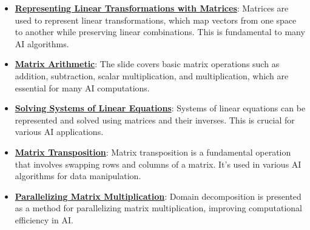 \documentclass{article}%
\begin{document}
\begin{itemize}[leftmargin=*]%
\item \href{https://purdue.brightspace.com/d2l/common/assets/pdfjs-d2l-dist/1.0.14-legacy/web/viewer.html?file=\%2Fcontent\%2Fenforced\%2F1095467-wl.202510.CS.24300.001\%2F04L1-Linear Algebra Primer.pdf\%3Fou\%3D1095467\&lang=en-us\&container=d2l-fileviewer-rendered-pdf\&fullscreen=d2l-fileviewer-rendered-pdf-dialog\&height=667#page=5}{\textbf{Representing Linear Transformations with Matrices}}: Matrices are used to represent linear transformations, which map vectors from one space to another while preserving linear combinations. This is fundamental to many AI algorithms.%
\item \href{https://purdue.brightspace.com/d2l/common/assets/pdfjs-d2l-dist/1.0.14-legacy/web/viewer.html?file=\%2Fcontent\%2Fenforced\%2F1095467-wl.202510.CS.24300.001\%2F04L1-Linear Algebra Primer.pdf\%3Fou\%3D1095467\&lang=en-us\&container=d2l-fileviewer-rendered-pdf\&fullscreen=d2l-fileviewer-rendered-pdf-dialog\&height=667#page=9}{\textbf{Matrix Arithmetic}}: The slide covers basic matrix operations such as addition, subtraction, scalar multiplication, and multiplication, which are essential for many AI computations.%
\item \href{https://purdue.brightspace.com/d2l/common/assets/pdfjs-d2l-dist/1.0.14-legacy/web/viewer.html?file=\%2Fcontent\%2Fenforced\%2F1095467-wl.202510.CS.24300.001\%2F04L1-Linear Algebra Primer.pdf\%3Fou\%3D1095467\&lang=en-us\&container=d2l-fileviewer-rendered-pdf\&fullscreen=d2l-fileviewer-rendered-pdf-dialog\&height=667#page=11}{\textbf{Solving Systems of Linear Equations}}: Systems of linear equations can be represented and solved using matrices and their inverses. This is crucial for various AI applications.%
\item \href{https://purdue.brightspace.com/d2l/common/assets/pdfjs-d2l-dist/1.0.14-legacy/web/viewer.html?file=\%2Fcontent\%2Fenforced\%2F1095467-wl.202510.CS.24300.001\%2F04L1-Linear Algebra Primer.pdf\%3Fou\%3D1095467\&lang=en-us\&container=d2l-fileviewer-rendered-pdf\&fullscreen=d2l-fileviewer-rendered-pdf-dialog\&height=667#page=16}{\textbf{Matrix Transposition}}: Matrix transposition is a fundamental operation that involves swapping rows and columns of a matrix. It's used in various AI algorithms for data manipulation.%
\item \href{https://purdue.brightspace.com/d2l/common/assets/pdfjs-d2l-dist/1.0.14-legacy/web/viewer.html?file=\%2Fcontent\%2Fenforced\%2F1095467-wl.202510.CS.24300.001\%2F04L1-Linear Algebra Primer.pdf\%3Fou\%3D1095467\&lang=en-us\&container=d2l-fileviewer-rendered-pdf\&fullscreen=d2l-fileviewer-rendered-pdf-dialog\&height=667#page=18}{\textbf{Parallelizing Matrix Multiplication}}: Domain decomposition is presented as a method for parallelizing matrix multiplication, improving computational efficiency in AI.%

\end{itemize}
\end{document}
